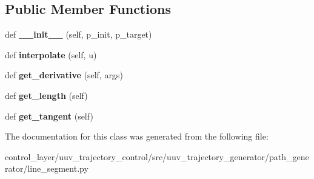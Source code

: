 \subsection*{Public Member Functions}
\begin{DoxyCompactItemize}
\item 
\mbox{\label{classuuv__trajectory__generator_1_1path__generator_1_1line__segment_1_1LineSegment_acb49e9fa3b6ab890625daa5abe61ef31}} 
def {\bfseries \+\_\+\+\_\+init\+\_\+\+\_\+} (self, p\+\_\+init, p\+\_\+target)
\item 
\mbox{\label{classuuv__trajectory__generator_1_1path__generator_1_1line__segment_1_1LineSegment_a9aad830ce5fa990021cea72f950ee193}} 
def {\bfseries interpolate} (self, u)
\item 
\mbox{\label{classuuv__trajectory__generator_1_1path__generator_1_1line__segment_1_1LineSegment_a8efe4da5d86abc6a01df1724b166dffe}} 
def {\bfseries get\+\_\+derivative} (self, args)
\item 
\mbox{\label{classuuv__trajectory__generator_1_1path__generator_1_1line__segment_1_1LineSegment_a7618de32bc394fe55ec18018f51ebb33}} 
def {\bfseries get\+\_\+length} (self)
\item 
\mbox{\label{classuuv__trajectory__generator_1_1path__generator_1_1line__segment_1_1LineSegment_a35328684d4961cff4901629475474ba2}} 
def {\bfseries get\+\_\+tangent} (self)
\end{DoxyCompactItemize}


The documentation for this class was generated from the following file\+:\begin{DoxyCompactItemize}
\item 
control\+\_\+layer/uuv\+\_\+trajectory\+\_\+control/src/uuv\+\_\+trajectory\+\_\+generator/path\+\_\+generator/line\+\_\+segment.\+py\end{DoxyCompactItemize}
